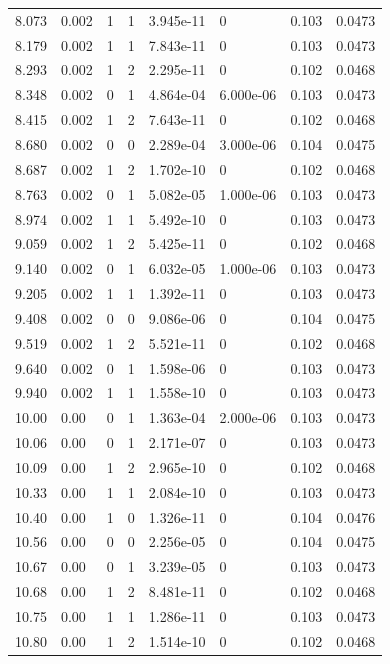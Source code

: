 \documentclass[preview]{standalone}
\begin{document}
{{{\begin{tabular}{L{1.2cm}C{1.2cm} C{0.3cm}C{0.5cm} C{1.4cm}C{1.4cm} C{1.4cm}C{1.4cm}}
  8.073  &  0.002  & 1     &  1 &  3.945e-11  & 0  & 0.103 &  0.0473   \\ 
  8.179  &  0.002  & 1     &  1 &  7.843e-11  & 0  & 0.103 &  0.0473   \\ 
  8.293  &  0.002  & 1     &  2 &  2.295e-11  & 0  & 0.102 &  0.0468   \\ 
  8.348  &  0.002  & 0     &  1 &  4.864e-04  & 6.000e-06  & 0.103 &  0.0473   \\ 
  8.415  &  0.002  & 1     &  2 &  7.643e-11  & 0  & 0.102 &  0.0468   \\ 
  8.680  &  0.002  & 0     &  0 &  2.289e-04  & 3.000e-06  & 0.104 &  0.0475   \\ 
  8.687  &  0.002  & 1     &  2 &  1.702e-10  & 0  & 0.102 &  0.0468   \\ 
  8.763  &  0.002  & 0     &  1 &  5.082e-05  & 1.000e-06  & 0.103 &  0.0473   \\ 
  8.974  &  0.002  & 1     &  1 &  5.492e-10  & 0  & 0.103 &  0.0473   \\ 
  9.059  &  0.002  & 1     &  2 &  5.425e-11  & 0  & 0.102 &  0.0468   \\ 
  9.140  &  0.002  & 0     &  1 &  6.032e-05  & 1.000e-06  & 0.103 &  0.0473   \\ 
  9.205  &  0.002  & 1     &  1 &  1.392e-11  & 0  & 0.103 &  0.0473   \\ 
  9.408  &  0.002  & 0     &  0 &  9.086e-06  & 0  & 0.104 &  0.0475   \\ 
  9.519  &  0.002  & 1     &  2 &  5.521e-11  & 0  & 0.102 &  0.0468   \\ 
  9.640  &  0.002  & 0     &  1 &  1.598e-06  & 0  & 0.103 &  0.0473   \\ 
  9.940  &  0.002  & 1     &  1 &  1.558e-10  & 0  & 0.103 &  0.0473   \\ 
  10.00  &  0.00  & 0     &  1 &  1.363e-04  & 2.000e-06  & 0.103 &  0.0473   \\ 
  10.06  &  0.00  & 0     &  1 &  2.171e-07  & 0  & 0.103 &  0.0473   \\ 
  10.09  &  0.00  & 1     &  2 &  2.965e-10  & 0  & 0.102 &  0.0468   \\ 
  10.33  &  0.00  & 1     &  1 &  2.084e-10  & 0  & 0.103 &  0.0473   \\ 
  10.40  &  0.00  & 1     &  0 &  1.326e-11  & 0  & 0.104 &  0.0476   \\ 
  10.56  &  0.00  & 0     &  0 &  2.256e-05  & 0  & 0.104 &  0.0475   \\ 
  10.67  &  0.00  & 0     &  1 &  3.239e-05  & 0  & 0.103 &  0.0473   \\ 
  10.68  &  0.00  & 1     &  2 &  8.481e-11  & 0  & 0.102 &  0.0468   \\ 
  10.75  &  0.00  & 1     &  1 &  1.286e-11  & 0  & 0.103 &  0.0473   \\ 
  10.80  &  0.00  & 1     &  2 &  1.514e-10  & 0  & 0.102 &  0.0468   \\ 
\hline 
\end{tabular} 

}}}
\end{document}
